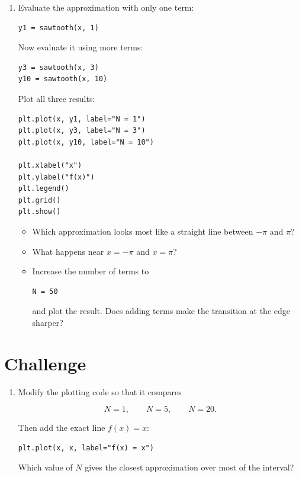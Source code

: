 \documentclass{article}
\begin{document}
\begin{enumerate}

\item Evaluate the approximation with only one term:

\begin{verbatim}
y1 = sawtooth(x, 1)
\end{verbatim}

Now evaluate it using more terms:

\begin{verbatim}
y3 = sawtooth(x, 3)
y10 = sawtooth(x, 10)
\end{verbatim}

Plot all three results:

\begin{verbatim}
plt.plot(x, y1, label="N = 1")
plt.plot(x, y3, label="N = 3")
plt.plot(x, y10, label="N = 10")

plt.xlabel("x")
plt.ylabel("f(x)")
plt.legend()
plt.grid()
plt.show()
\end{verbatim}

\begin{itemize}

\item Which approximation looks most like a straight line between
$-\pi$ and $\pi$?

\item What happens near $x=-\pi$ and $x=\pi$?

\item Increase the number of terms to

\begin{verbatim}
N = 50
\end{verbatim}

and plot the result.  Does adding terms make the transition at the
edge sharper?

\end{itemize}

\end{enumerate}


\section{Challenge}

\begin{enumerate}

\item Modify the plotting code so that it compares

\[
N=1,\qquad N=5,\qquad N=20.
\]

Then add the exact line $f(x)=x$:

\begin{verbatim}
plt.plot(x, x, label="f(x) = x")
\end{verbatim}

Which value of $N$ gives the closest approximation over most of the
interval?

\end{enumerate}
\end{document}
